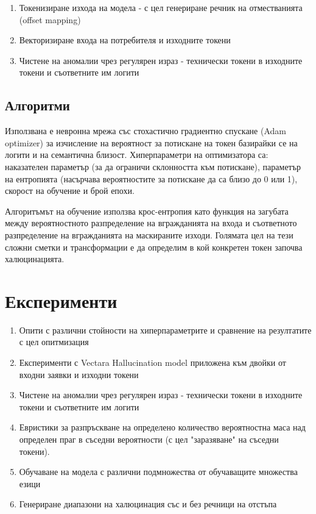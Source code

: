 \documentclass[12pt]{article}
\begin{document}
		\begin{enumerate}    
			\item[\textbullet] Токенизиране  изхода на модела - с цел генериране речник на отместванията (offset mapping)
			\item[\textbullet] Векторизиране входа на потребителя и изходните токени
			\item[\textbullet] Чистене на аномалии чрез регулярен израз - технически токени в изходните токени и съответните им логити
			\end{enumerate}
	
	\subsection{Алгоритми} 
	
	Използвана е невронна мрежа със стохастично градиентно спускане (Adam optimizer) за изчисление на вероятност за потискане на токен базирайки се на логити и на семантична близост. Хиперпараметри на оптимизатора са: наказателен параметър (за да ограничи склонността към потискане), параметър на ентропията (насърчава вероятностите за потискане да са близо до 0 или 1), скорост на обучение и брой епохи.
	
	Алгоритъмът на обучение използва крос-ентропия като функция на загубата между вероятностното разпределение на вгражданията на входа и съответното разпределение на вгражданията на  маскираните изходи. 
	Голямата цел на тези сложни сметки и трансформации е да определим в кой конкретен токен започва халюцинацията.
	\section{Експерименти}
	
	\begin{enumerate}    
		\item[\textbullet] Опити с  различни стойности на хиперпараметрите и сравнение на резултатите с цел опитмизация
		\item[\textbullet] Експерименти с Vectara Hallucination model приложена към двойки от входни заявки и изходни токени
		\item[\textbullet] Чистене на аномалии чрез регулярен израз - технически токени в изходните токени и съответните им логити
	    \item[\textbullet] Евристики за разпръскване на определено количество вероятностна маса над определен праг в съседни вероятности (с цел "заразяване" на съседни токени).
	     \item[\textbullet] Обучаване на модела с различни подмножества от обучаващите множества езици
	     \item[\textbullet] Генериране диапазони на халюцинация със и без речници на отстъпа
	\end{enumerate}
	
\end{document}
